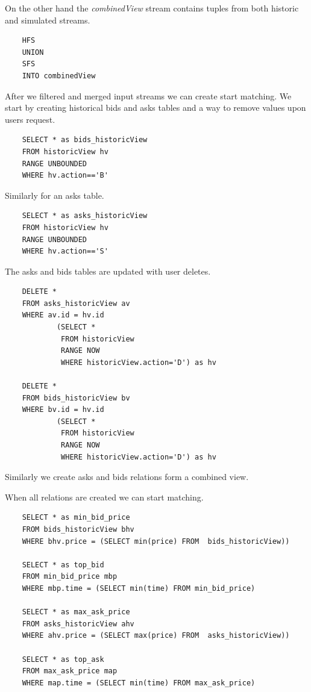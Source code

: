 \documentclass{article}
\begin{document}
\noindent On the other hand the \emph{combinedView} stream contains tuples from both historic and simulated streams. 

\begin{verbatim}  
    HFS
    UNION
    SFS
    INTO combinedView
\end{verbatim}

\noindent After we filtered and merged input streams we can create start matching. We start by creating historical bids and asks tables and a way to remove values upon users request. 

\begin{verbatim}  
    SELECT * as bids_historicView
    FROM historicView hv
    RANGE UNBOUNDED
    WHERE hv.action=='B'
\end{verbatim}

\noindent Similarly for an asks table.

\begin{verbatim}  
    SELECT * as asks_historicView
    FROM historicView hv
    RANGE UNBOUNDED
    WHERE hv.action=='S'
\end{verbatim}

\noindent The asks and bids tables are updated with user deletes.

\begin{verbatim}  
    DELETE *
    FROM asks_historicView av
    WHERE av.id = hv.id
            (SELECT * 
             FROM historicView
             RANGE NOW
             WHERE historicView.action='D') as hv  

    DELETE *
    FROM bids_historicView bv
    WHERE bv.id = hv.id
            (SELECT * 
             FROM historicView
             RANGE NOW
             WHERE historicView.action='D') as hv 
\end{verbatim}

Similarly we create asks and bids relations form a combined view. 

When all relations are created we can start matching.

\begin{verbatim}      
    SELECT * as min_bid_price
    FROM bids_historicView bhv
    WHERE bhv.price = (SELECT min(price) FROM  bids_historicView))
    
    SELECT * as top_bid
    FROM min_bid_price mbp
    WHERE mbp.time = (SELECT min(time) FROM min_bid_price)
    
    SELECT * as max_ask_price
    FROM asks_historicView ahv
    WHERE ahv.price = (SELECT max(price) FROM  asks_historicView))
    
    SELECT * as top_ask
    FROM max_ask_price map
    WHERE map.time = (SELECT min(time) FROM max_ask_price)
\end{verbatim}
\end{document}
